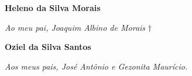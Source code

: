 \begin{dedicatoria}
   \textbf{Heleno da Silva Morais}
   \vspace*{\fill}
   \begin{flushright}
   	\textit{Ao meu pai, Joaquim Albino de Morais} $\dagger$\\
   \end{flushright}
	\noindent
   \textbf{Oziel da Silva Santos}
   
   \vspace*{\fill}
   \begin{flushright}
   	\textit{Aos meus pais, José Antônio e Gezonita Maurício.}
   \end{flushright}
   
\end{dedicatoria}
